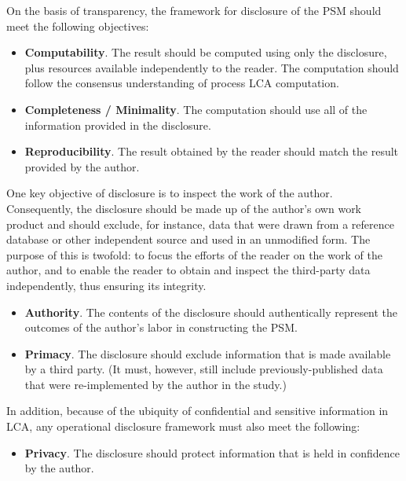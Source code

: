 On the basis of transparency, the framework for disclosure of the PSM should meet the following objectives:
\begin{itemize}
\item \textbf{Computability}. The result should be computed using only the disclosure, plus resources available independently to the reader.  The computation should follow the consensus understanding of process LCA computation.
\item \textbf{Completeness / Minimality}.  The computation should use all of the information provided in the disclosure.
\item \textbf{Reproducibility}.  The result obtained by the reader should match the result provided by the author.
\end{itemize}
One key objective of disclosure is to inspect the work of the author.  Consequently, the disclosure should be made up of the author's own work product and should exclude, for instance, data that were drawn from a reference database or other independent source and used in an unmodified form.  The purpose of this is twofold: to focus the efforts of the reader on the work of the author, and to enable the reader to obtain and inspect the third-party data independently, thus ensuring its integrity.
\begin{itemize}
\item \textbf{Authority}.  The contents of the disclosure should authentically represent the outcomes of the author's labor in constructing the PSM.
\item \textbf{Primacy}.  The disclosure should exclude information that is made available by a third party.  (It must, however, still include previously-published data that were re-implemented by the author in the study.)
\end{itemize}
In addition, because of the ubiquity of confidential and sensitive information in LCA, any operational disclosure framework must also meet the following:
\begin{itemize}
\item \textbf{Privacy}.  The disclosure should protect information that is held in confidence by the author.
\end{itemize}

\endinput




